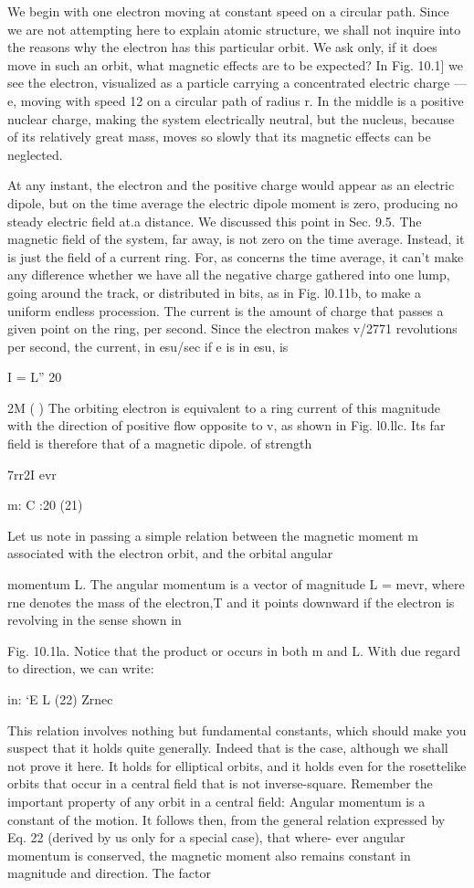 {We begin with one electron moving at constant speed on a circular
path. Since we are not attempting here to explain atomic structure,
we shall not inquire into the reasons why the electron has this particular
orbit. We ask only, if it does move in such an orbit, what
magnetic effects are to be expected? In Fig. 10.1] we see the 
electron, visualized as a particle carrying a concentrated electric charge
 ---  e, moving with speed 12 on a circular path of radius r. In the middle
is a positive nuclear charge, making the system electrically neutral,
but the nucleus, because of its relatively great mass, moves so slowly
that its magnetic effects can be neglected.

At any instant, the electron and the positive charge would appear
as an electric dipole, but on the time average the electric dipole
moment is zero, producing no steady electric field at.a distance. We
discussed this point in Sec. 9.5. The magnetic field of the system,
far away, is not zero on the time average. Instead, it is just the field
of a current ring. For, as concerns the time average, it can't make
any diflerence whether we have all the negative charge gathered into
one lump, going around the track, or distributed in bits, as in
Fig. l0.11b, to make a uniform endless procession. The current is
the amount of charge that passes a given point on the ring, per
second. Since the electron makes v/2771 revolutions per second, the
current, in esu/sec if e is in esu, is

I = L'' 20

2M ( )
The orbiting electron is equivalent to a ring current of this magnitude
with the direction of positive flow opposite to v, as shown in
Fig. l0.llc. Its far field is therefore that of a magnetic dipole. of
strength

7rr2I evr

m: C :20 (21)

Let us note in passing a simple relation between the magnetic
moment m associated with the electron orbit, and the orbital angular

momentum L. The angular momentum is a vector of magnitude
L = mevr, where rne denotes the mass of the electron,T and it points
downward if the electron is revolving in the sense shown in

Fig. 10.1la. Notice that the product or occurs in both m and L.
With due regard to direction, we can write:

in: ‘E L (22)
Zrnec

This relation involves nothing but fundamental constants, which
should make you suspect that it holds quite generally. Indeed that
is the case, although we shall not prove it here. It holds for elliptical
orbits, and it holds even for the rosettelike orbits that occur in a
central field that is not inverse-square. Remember the important
property of any orbit in a central field: Angular momentum is a constant
of the motion. It follows then, from the general relation expressed
by Eq. 22 (derived by us only for a special case), that where-
ever angular momentum is conserved, the magnetic moment also
remains constant in magnitude and direction. The factor

}
